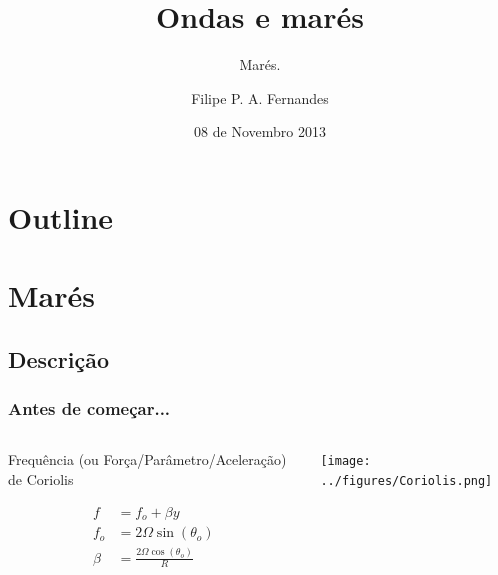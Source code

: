 \title[Aula 08]{Ondas e marés}
\subtitle{Marés.}
\author[Filipe Fernandes]{Filipe P. A. Fernandes}
\date[Novembro 2013]{08 de Novembro 2013}




\begin{frame}[plain]
  \titlepage
\end{frame}

\section*{Outline}
\begin{frame}
\tableofcontents
\end{frame}

\section{Marés}
\subsection{Descrição}

\begin{frame}

  \frametitle{Antes de começar...}
  \begin{columns}
    \begin{column}{0.5\textwidth}
  \small{
  Frequência (ou Força/Parâmetro/Aceleração) de Coriolis
  \begin{block}{}
    \begin{align}
      f &= f_o + \beta y \\
      f_o &= 2\Omega\sin(\theta_o) \\
      \beta &= \frac{2\Omega\cos(\theta_o)}{R}
    \end{align}
  \end{block}
  }
    \end{column}
    \begin{column}{0.5\textwidth}
      \begin{center}
        \texttt{[image: ../figures/Coriolis.png]}
      \end{center}
    \end{column}
  \end{columns}
\end{frame}

